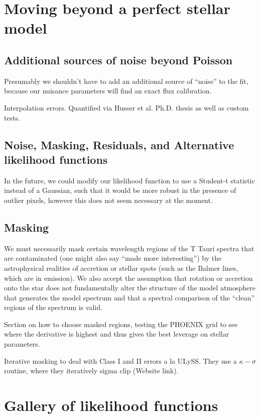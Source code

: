 \documentclass[preprint]{aastex} %
\begin{document}
\section{Moving beyond a perfect stellar model}
\label{sec:residuals}


\subsection{Additional sources of noise beyond Poisson}
Presumably we shouldn't have to add an additional source of ``noise'' to the fit, because our nuisance parameters will find an exact flux calibration.

Interpolation errors. Quantified via Husser et al. Ph.D. thesis as well as custom tests.

\subsection{Noise, Masking, Residuals, and Alternative likelihood functions}
In the future, we could modify our likelihood function to use a Student-t statistic instead of a Gaussian, such that it would be more robust in the presence of outlier pixels, however this does not seem necessary at the moment. 

\subsection{Masking}

We must necessarily mask certain wavelength regions of the T Tauri spectra that are contaminated (one might also say ``made more interesting'') by the astrophysical realities of accretion or stellar spots (such as the Balmer lines, which are in emission).  We also accept the assumption that rotation or accretion onto the star does not fundamentally alter the structure of the model atmosphere that generates the model spectrum and that a spectral comparison of the ``clean'' regions of the spectrum is valid.

Section on how to choose masked regions, testing the PHOENIX grid to see where the derivative is highest and thus gives the best leverage on stellar parameters.


Iterative masking to deal with Class I and II errors a la ULySS. They use a $\kappa - \sigma$ routine, where they iteratively sigma clip (Website link).


\section{Gallery of likelihood functions}
\end{document}
